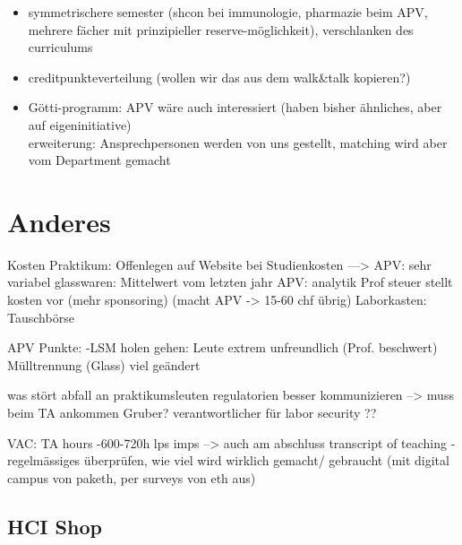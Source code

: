 \documentclass{article}
\begin{document}
\begin{itemize}
    \item symmetrischere semester (shcon bei immunologie, pharmazie beim APV, mehrere fächer mit prinzipieller reserve-möglichkeit), verschlanken des curriculums
    \item creditpunkteverteilung (wollen wir das aus dem walk\&talk kopieren?)
    \item Götti-programm: APV wäre auch interessiert (haben bisher ähnliches, aber auf eigeninitiative)\\
    erweiterung: Ansprechpersonen werden von uns gestellt, matching wird aber vom Department gemacht
\end{itemize}

\section{Anderes}
Kosten Praktikum: Offenlegen auf Website bei Studienkosten
---> APV: sehr variabel
glasswaren: Mittelwert vom letzten jahr
APV: analytik Prof steuer stellt kosten vor
(mehr sponsoring) (macht APV -> 15-60 chf übrig)
Laborkasten: Tauschbörse


APV Punkte:
-LSM holen gehen: Leute extrem unfreundlich (Prof. beschwert)
Mülltrennung (Glass) viel geändert

was stört abfall an praktikumsleuten
regulatorien besser kommunizieren
--> muss beim TA ankommen
Gruber? verantwortlicher für labor security ??

VAC: TA hours
-600-720h lps imps --> auch am abschluss transcript of teaching
-regelmässiges überprüfen, wie viel wird wirklich gemacht/ gebraucht (mit digital campus von paketh, per surveys von eth aus)

\subsection{HCI Shop}
\end{document}
